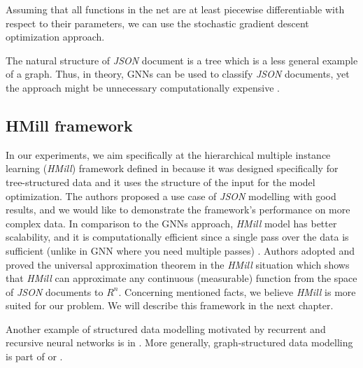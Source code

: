 Assuming that all functions in the net are at least piecewise differentiable with respect to their parameters, we can use the stochastic gradient descent optimization approach.

The natural structure of \emph{JSON} document is a tree which is a less general example of a graph. Thus, in theory, GNNs can be used to classify \emph{JSON} documents, yet the approach might be unnecessary computationally expensive \cite{Pevny2020}.

\subsection{HMill framework}
In our experiments, we aim specifically at the hierarchical multiple instance learning (\emph{HMill}) framework defined in \cite{Mandlik2020} because it was designed specifically for tree-structured data and it uses the structure of the input for the model optimization. The authors proposed a use case of \emph{JSON} modelling with good results, and we would like to demonstrate the framework's performance on more complex data. In comparison to the GNNs approach, \emph{HMill} model has better scalability, and it is computationally efficient since a single pass over the data is sufficient (unlike in GNN where you need multiple passes) \cite{Mandlik2020}. Authors adopted and proved the universal approximation theorem \cite{Hornik1991} in the \emph{HMill} situation which shows that \emph{HMill} can approximate any continuous (measurable) function from the space of \emph{JSON} documents to $R^n$. Concerning mentioned facts, we believe \emph{HMill} is more suited for our problem. We will describe this framework in the next chapter.

\hfill \break
Another example of structured data modelling motivated by recurrent and recursive neural networks is in \cite{Woof2020}. More generally, graph-structured data modelling is part of \cite{Henaff2015} or \cite{Borgwardt2005}.